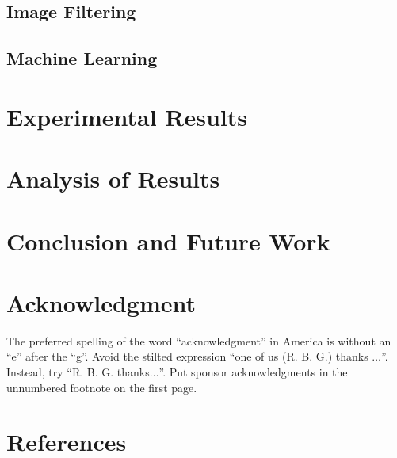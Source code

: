\documentclass[conference]{IEEEtran}
\begin{document}
\subsection{Image Filtering}

\subsection{Machine Learning}

\section{Experimental Results}\label{results}

\section{Analysis of Results}\label{analysis}

\section{Conclusion and Future Work}\label{conclusion}

\section*{Acknowledgment}

The preferred spelling of the word ``acknowledgment'' in America is without 
an ``e'' after the ``g''. Avoid the stilted expression ``one of us (R. B. 
G.) thanks $\ldots$''. Instead, try ``R. B. G. thanks$\ldots$''. Put sponsor 
acknowledgments in the unnumbered footnote on the first page.

\section*{References}
\end{document}
